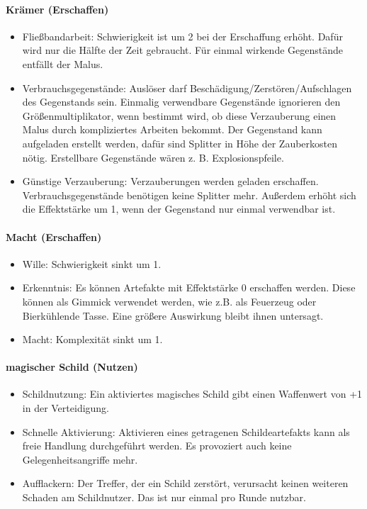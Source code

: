 \documentclass{article}
\begin{document}
\paragraph{Krämer (Erschaffen)}

\begin{itemize}
\item Fließbandarbeit: Schwierigkeit ist um 2 bei der Erschaffung erhöht. Dafür wird nur die Hälfte der Zeit gebraucht. Für einmal wirkende Gegenstände entfällt der Malus.
\item Verbrauchsgegenstände: Auslöser darf Beschädigung/Zerstören/Aufschlagen des Gegenstands sein. Einmalig verwendbare Gegenstände ignorieren den Größenmultiplikator, wenn bestimmt wird, ob diese Verzauberung einen Malus durch kompliziertes Arbeiten bekommt. Der Gegenstand kann aufgeladen erstellt werden, dafür sind Splitter in Höhe der Zauberkosten nötig. Erstellbare Gegenstände wären z. B. Explosionspfeile.
\item Günstige Verzauberung: Verzauberungen werden geladen erschaffen. Verbrauchsgegenstände benötigen keine Splitter mehr. Außerdem erhöht sich die Effektstärke um 1, wenn der Gegenstand nur einmal verwendbar ist.
\end{itemize}

\paragraph{Macht (Erschaffen)}

\begin{itemize}
\item Wille: Schwierigkeit sinkt um 1.
\item Erkenntnis: Es können Artefakte mit Effektstärke 0 erschaffen werden. Diese können als Gimmick verwendet werden, wie z.B. als Feuerzeug oder Bierkühlende Tasse. Eine größere Auswirkung bleibt ihnen untersagt.
\item Macht: Komplexität sinkt um 1.
\end{itemize}

\paragraph{magischer Schild (Nutzen)}

\begin{itemize}
\item Schildnutzung: Ein aktiviertes magisches Schild gibt einen Waffenwert von +1 in der Verteidigung.
\item Schnelle Aktivierung: Aktivieren eines getragenen Schildeartefakts kann als freie Handlung durchgeführt werden. Es provoziert auch keine Gelegenheitsangriffe mehr.
\item Aufflackern: Der Treffer, der ein Schild zerstört, verursacht keinen weiteren Schaden am Schildnutzer. Das ist nur einmal pro Runde nutzbar.
\end{itemize}
\end{document}

